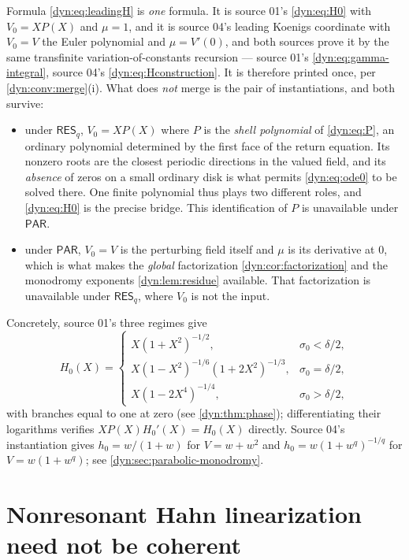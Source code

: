 \documentclass[11pt,letterpaper]{article}
\theoremstyle{definition}
\theoremstyle{remark}
\newcommand{\resq}{\mathsf{RES}_q}
\newcommand{\pares}{\mathsf{PAR}}
\numberwithin{equation}{section}
\begin{document}
Formula \eqref{dyn:eq:leadingH} is \emph{one} formula. It is source 01's
\eqref{dyn:eq:H0} with $V_0=XP(X)$ and $\mu=1$, and it is source 04's
leading Koenigs coordinate with $V_0=V$ the Euler polynomial and
$\mu=V'(0)$, and both sources prove it by the same transfinite
variation-of-constants recursion --- source 01's
\eqref{dyn:eq:gamma-integral}, source 04's
\eqref{dyn:eq:Hconstruction}. It is therefore printed once, per
\cref{dyn:conv:merge}(i). What does \emph{not} merge is the pair of
instantiations, and both survive:
\begin{itemize}
\item under $\resq$, $V_0=XP(X)$ where $P$ is the \emph{shell polynomial}
of \eqref{dyn:eq:P}, an ordinary polynomial determined by the first face of
the return equation. Its nonzero roots are the closest periodic directions
in the valued field, and its \emph{absence} of zeros on a small ordinary
disk is what permits \eqref{dyn:eq:ode0} to be solved there. One finite
polynomial thus plays two different roles, and \eqref{dyn:eq:H0} is the
precise bridge. This identification of $P$ is unavailable under $\pares$.
\item under $\pares$, $V_0=V$ is the perturbing field itself and $\mu$ is
its derivative at $0$, which is what makes the \emph{global} factorization
\cref{dyn:cor:factorization} and the monodromy exponents
\cref{dyn:lem:residue} available. That factorization is unavailable under
$\resq$, where $V_0$ is not the input.
\end{itemize}
Concretely, source 01's three regimes give
\begin{equation}\label{dyn:eq:phase-H0}
 H_0(X)=\begin{cases}
 X(1+X^{2})^{-1/2}, & \sigma_0<\delta/2,\\[2pt]
 X(1-X^{2})^{-1/6}(1+2X^{2})^{-1/3}, & \sigma_0=\delta/2,\\[2pt]
 X(1-2X^{4})^{-1/4}, & \sigma_0>\delta/2,
 \end{cases}
\end{equation}
with branches equal to one at zero (see \cref{dyn:thm:phase});
differentiating their logarithms verifies $XP(X)H_0'(X)=H_0(X)$ directly.
Source 04's instantiation gives $h_0=w/(1+w)$ for $V=w+w^{2}$ and
$h_0=w(1+w^{q})^{-1/q}$ for $V=w(1+w^{q})$; see
\cref{dyn:sec:parabolic-monodromy}.

\section{Nonresonant Hahn linearization need not be coherent}
\label{dyn:sec:noncoherent}
\end{document}
